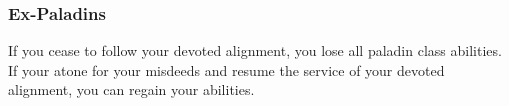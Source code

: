 
        \subsubsection{Ex-Paladins}
            If you cease to follow your devoted alignment, you lose all  paladin class abilities.
            If your atone for your misdeeds and resume the service of your devoted alignment, you can regain your abilities.

